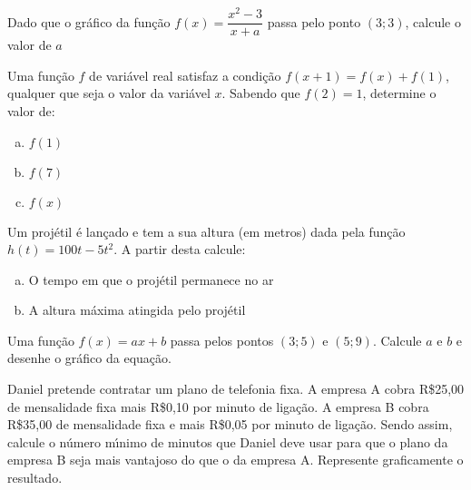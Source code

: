 \begin{prob}
Dado que o gr\'{a}fico da fun\c{c}\~{a}o $f\left( x\right) =\dfrac{x^{2}-3}{x+a}$ passa pelo ponto $(3;3)$, calcule o valor de $a$
\end{prob}

\begin{prob}
Uma fun\c{c}\~{a}o $f$ de vari\'{a}vel real satisfaz a condi\c{c}\~{a}o $f\left( x + 1\right) = f\left( x\right) + f\left( 1\right) $, qualquer que seja o valor da vari\'{a}vel $x$. Sabendo que $f\left( 2\right) = 1$, determine o valor de:
\begin{multicols}{3}
\begin{enumerate}[(a)]
\item    $f\left( 1\right)$
\item    $f\left( 7\right)$
\item    $f\left( x\right)$
\end{enumerate}
\end{multicols}
\end{prob}

\begin{prob}
Um proj\'{e}til \'{e} lan\c{c}ado e tem a sua altura (em metros) dada pela fun\c{c}\~{a}o $h\left( t\right) =100t-5t^{2}$. A partir desta calcule:
\begin{multicols}{2}
\begin{enumerate}[(a)]
\item    O tempo em que o proj\'{e}til permanece no ar
\item    A altura m\'{a}xima atingida pelo  proj\'{e}til
\end{enumerate}
\end{multicols}
\end{prob}

\begin{prob}
Uma fun\c{c}\~{a}o $f\left( x\right) =ax+b$ passa pelos pontos $\left( 3;5\right)$ e $\left( 5;9\right) $. Calcule $a$ e $b$ e desenhe o gr\'{a}fico da equa\c{c}\~{a}o.
\end{prob}

\begin{prob}
Daniel pretende contratar um plano de telefonia fixa. A empresa A cobra R\$25,00 de mensalidade fixa mais R\$0,10 por minuto de liga\c{c}\~{a}o. A empresa B cobra R\$35,00 de mensalidade fixa e mais R\$0,05 por minuto de liga\c{c}\~{a}o. Sendo assim, calcule o n\'{u}mero m\'{\i}nimo de minutos que Daniel deve usar para que o plano da empresa B seja mais vantajoso do que o da empresa A. Represente graficamente o resultado.
\end{prob}

